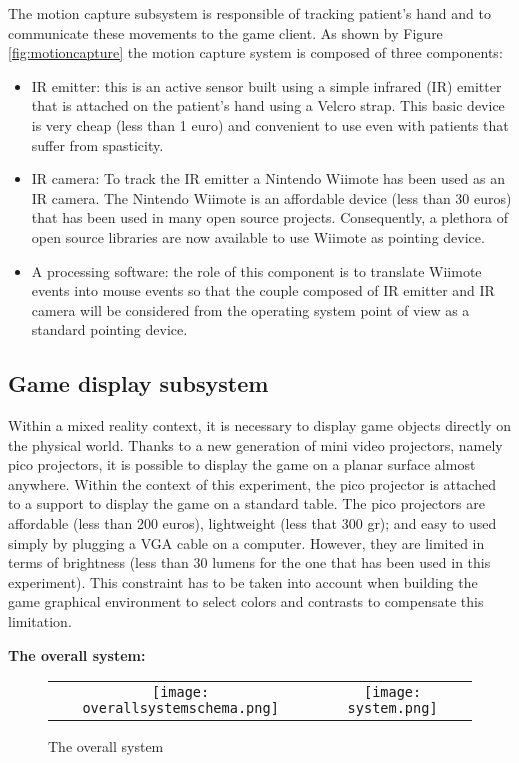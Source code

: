 \documentclass[preprint,authoryear,12pt]{elsarticle}
\begin{document}
The motion capture subsystem is responsible of tracking patient's hand and to communicate these movements to the game client. As shown by Figure \ref{fig:motioncapture} the motion capture system is composed of three components:
\begin{itemize}
\item IR emitter: this is an active sensor built using a simple infrared (IR) emitter that is attached on the patient's hand using a Velcro strap. This basic device is very cheap (less than 1 euro) and convenient to use even with patients that suffer from spasticity.
\item IR camera: To track the IR emitter a Nintendo Wiimote has been used as an IR camera. The Nintendo Wiimote is an affordable device (less than 30 euros) that has been used in many open source projects. Consequently, a plethora of open source libraries are now available to use Wiimote as pointing device.
\item A processing software: the role of this component is to translate Wiimote events into mouse events so that the couple composed of IR emitter and IR camera will be considered from the operating system point of view as a standard pointing device.
\end{itemize}

\subsection{Game display subsystem}
Within a mixed reality context, it is necessary to display game objects directly on the physical world. Thanks to a new generation of mini video projectors, namely pico projectors, it is possible to display the game on a planar surface almost anywhere. Within the context of this experiment, the pico projector is attached to a support to display the game on a standard table.
The pico projectors are affordable (less than 200 euros), lightweight (less that 300 gr); and easy to used simply by plugging a VGA cable on a computer. However, they are limited in terms of brightness (less than 30 lumens for the one that has been used in this experiment). This constraint has to be taken into account when building the game graphical environment to select colors and contrasts to compensate this limitation.
\par\medskip
\textbf{The overall system:}
\begin{figure}[h]
	\centering
\begin{tabular}{cc}
		\texttt{[image: overallsystemschema.png]}&\texttt{[image: system.png]}
\end{tabular}
	\caption{The overall system \citep{fishtank}}
	\label{fig:overallsystemschema}
\end{figure}
\end{document}
